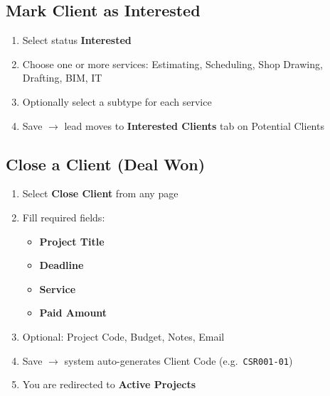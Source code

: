 \documentclass[11pt,a4paper]{article}
\begin{document}
\subsection{Mark Client as Interested}

\begin{workflowbox}
\begin{enumerate}
    \item Select status \textbf{Interested}
    \item Choose one or more services: Estimating, Scheduling, Shop Drawing, Drafting, BIM, IT
    \item Optionally select a subtype for each service
    \item Save $\rightarrow$ lead moves to \textbf{Interested Clients} tab on Potential Clients
\end{enumerate}
\end{workflowbox}

\subsection{Close a Client (Deal Won)}

\begin{workflowbox}
\begin{enumerate}
    \item Select \textbf{Close Client} from any page
    \item Fill required fields:
    \begin{itemize}
        \item \textbf{Project Title}
        \item \textbf{Deadline}
        \item \textbf{Service}
        \item \textbf{Paid Amount}
    \end{itemize}
    \item Optional: Project Code, Budget, Notes, Email
    \item Save $\rightarrow$ system auto-generates Client Code (e.g.\ \texttt{CSR001-01})
    \item You are redirected to \textbf{Active Projects}
\end{enumerate}
\end{workflowbox}

\end{document}
